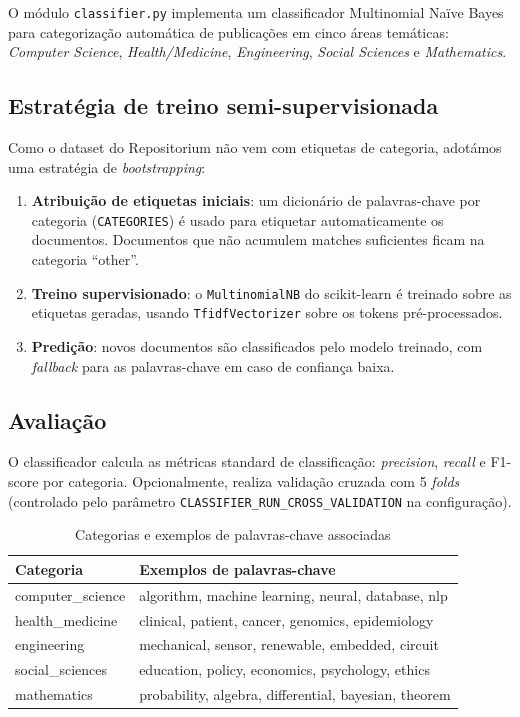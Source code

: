 \documentclass[12pt,a4paper]{article}
\begin{document}
O módulo \texttt{classifier.py} implementa um classificador Multinomial Naïve Bayes para categorização automática de publicações em cinco áreas temáticas: \emph{Computer Science}, \emph{Health/Medicine}, \emph{Engineering}, \emph{Social Sciences} e \emph{Mathematics}.

\subsection{Estratégia de treino semi-supervisionada}

Como o dataset do Repositorium não vem com etiquetas de categoria, adotámos uma estratégia de \emph{bootstrapping}:

\begin{enumerate}
    \item \textbf{Atribuição de etiquetas iniciais}: um dicionário de palavras-chave por categoria (\texttt{CATEGORIES}) é usado para etiquetar automaticamente os documentos. Documentos que não acumulem matches suficientes ficam na categoria ``other''.
    \item \textbf{Treino supervisionado}: o \texttt{MultinomialNB} do scikit-learn é treinado sobre as etiquetas geradas, usando \texttt{TfidfVectorizer} sobre os tokens pré-processados.
    \item \textbf{Predição}: novos documentos são classificados pelo modelo treinado, com \emph{fallback} para as palavras-chave em caso de confiança baixa.
\end{enumerate}

\subsection{Avaliação}

O classificador calcula as métricas standard de classificação: \emph{precision}, \emph{recall} e F1-score por categoria. Opcionalmente, realiza validação cruzada com 5 \emph{folds} (controlado pelo parâmetro \texttt{CLASSIFIER\_RUN\_CROSS\_VALIDATION} na configuração).

\begin{table}[H]
\centering
\caption{Categorias e exemplos de palavras-chave associadas}
\begin{tabular}{@{}ll@{}}
\toprule
\textbf{Categoria}    & \textbf{Exemplos de palavras-chave} \\
\midrule
computer\_science  & algorithm, machine learning, neural, database, nlp \\
health\_medicine   & clinical, patient, cancer, genomics, epidemiology \\
engineering        & mechanical, sensor, renewable, embedded, circuit \\
social\_sciences   & education, policy, economics, psychology, ethics \\
mathematics        & probability, algebra, differential, bayesian, theorem \\
\bottomrule
\end{tabular}
\end{table}
\end{document}
